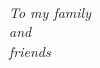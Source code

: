 
\cleardoublepage
~\vfill
\begin{center}
  \noindent\fontsize{12}{16}\selectfont\itshape
  To my family \\ 
  and\\ 
  friends
\end{center}
\vfill
\vfill
